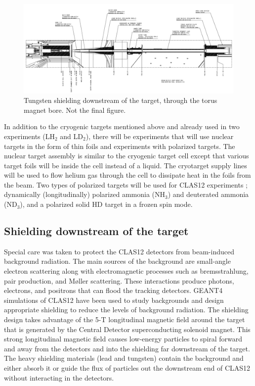 \begin{figure}[t]
\begin{center}
\includegraphics[width=1.\textwidth]{beamline_hall_shielding.pdf}
\caption{Tungsten shielding downstream of the target, through the torus magnet bore. {\color{red} Not the final figure.}}
\label{fig:shield}
\end{center}
\end{figure}


In addition to the cryogenic targets mentioned above and already used in two experiments (LH$_2$ and LD$_2$), there will be experiments
that will use nuclear targets in the form of thin foils and experiments with polarized targets. The nuclear target assembly is similar to the 
cryogenic target cell except that various target foils will be inside the cell instead of a liquid. The cryotarget supply lines will be used to flow 
helium gas through the cell to dissipate heat in the foils from the beam. Two types of polarized targets will be used for CLAS12 experiments
\cite{Keith:2015ete}; dynamically (longitudinally) polarized ammonia (NH$_3$) and deuterated ammonia (ND$_3$), and a polarized solid 
HD target in a frozen spin mode. 

\subsection{Shielding downstream of the target} 

Special care was taken to protect the CLAS12 detectors from beam-induced background radiation. The main sources of the background are 
small-angle electron scattering along with electromagnetic processes such as bremsstrahlung, pair production, and M{\o}ller scattering. 
These interactions produce photons, electrons, and positrons that can flood the tracking detectors. GEANT4 simulations of CLAS12
have been used to study backgrounds and design appropriate shielding to reduce the levels of background radiation.  The shielding design
takes advantage of the 5-T longitudinal magnetic field around the target that is generated by the Central Detector superconducting solenoid 
magnet. This strong longitudinal magnetic field causes low-energy particles to spiral forward and away from the detectors and into the 
shielding far downstream of the target. The heavy shielding materials (lead and tungsten) contain the background and either absorb it or 
guide the flux of particles out the downstream end of CLAS12 without interacting in the detectors. 

